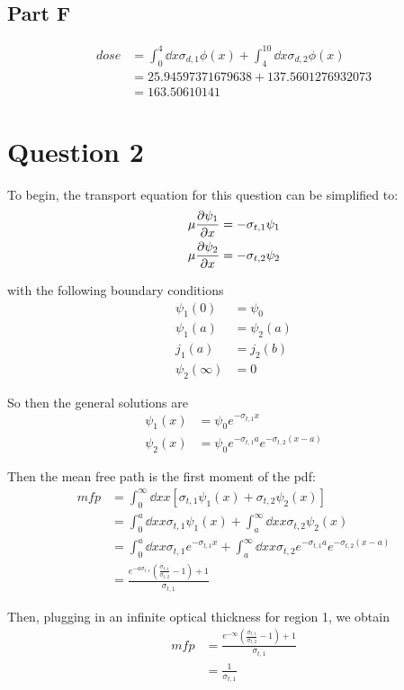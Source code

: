 \documentclass{article}
\begin{document}
\subsection{Part F}
\begin{align*}
  dose &= \int_0^4\dd{x}\sigma_{d,1} \phi(x) + \int_4^10\dd{x}\sigma_{d,2} \phi(x)\\
  &= 25.94597371679638 + 137.5601276932073\\
  &= 163.50610141
\end{align*}

\clearpage
\section{Question 2}
To begin, the transport equation for this question can be simplified to:
\begin{align*}
  \mu \pdv{\psi_1}{x} &= -\sigma_{t, 1}\psi_1\\
  \mu \pdv{\psi_2}{x} &= -\sigma_{t, 2}\psi_2
\end{align*}

with the following boundary conditions
\begin{align*}
  \psi_1(0) &= \psi_0\\
  \psi_1(a) &= \psi_2(a)\\
  j_1(a) &= j_2(b)\\
  \psi_2(\infty) &= 0
\end{align*}

So then the general solutions are 
\begin{align*}
  \psi_1(x) &= \psi_0e^{-\sigma_{t,1} x}\\
  \psi_2(x) &= \psi_0e^{-\sigma_{t,1} a}e^{-\sigma_{t,2} (x-a)}
\end{align*}

Then the mean free path is the first moment of the pdf:
\begin{align*}
  mfp &= \int_0^{\infty}\dd{x} x\left[\sigma_{t,1}\psi_1(x) + \sigma_{t,2}\psi_2(x)\right]\\
  &= \int_0^{a}\dd{x} x\sigma_{t,1}\psi_1(x) + \int_a^{\infty}\dd{x} x \sigma_{t,2}\psi_2(x)\\
  &= \int_0^{a}\dd{x} x\sigma_{t,1}e^{-\sigma_{t,1} x} + \int_a^{\infty}\dd{x} x \sigma_{t,2} e^{-\sigma_{t,1} a}e^{-\sigma_{t,2}(x-a)}\\
  &= \frac{e^{-a\sigma_{t,1}}\left(\frac{\sigma_{t,1}}{\sigma_{t,2}}-1\right)+1}{\sigma_{t,1}}
\end{align*}

Then, plugging in an infinite optical thickness for region 1, we obtain
\begin{align*}
  mfp &= \frac{e^{-\infty}\left(\frac{\sigma_{t,1}}{\sigma_{t,2}}-1\right)+1}{\sigma_{t,1}}\\
  &= \frac{1}{\sigma_{t,1}}
\end{align*}
\end{document}
